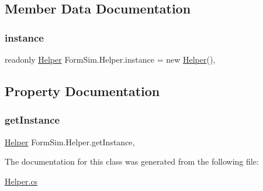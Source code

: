\subsection{Member Data Documentation}
\mbox{\label{class_form_sim_1_1_helper_a100712088360a52887cbecd891548038}} 
\subsubsection{\texorpdfstring{instance}{instance}}
{\footnotesize\ttfamily readonly \mbox{\hyperlink{class_form_sim_1_1_helper}{Helper}} Form\+Sim.\+Helper.\+instance = new \mbox{\hyperlink{class_form_sim_1_1_helper}{Helper}}()\hspace{0.3cm}{\ttfamily [static]}, {\ttfamily [private]}}



\subsection{Property Documentation}
\mbox{\label{class_form_sim_1_1_helper_ac61d1dca7ce9b1fa7e4ce17e99b0b7e1}} 
\subsubsection{\texorpdfstring{get\+Instance}{getInstance}}
{\footnotesize\ttfamily \mbox{\hyperlink{class_form_sim_1_1_helper}{Helper}} Form\+Sim.\+Helper.\+get\+Instance\hspace{0.3cm}{\ttfamily [static]}, {\ttfamily [get]}}



The documentation for this class was generated from the following file\+:\begin{DoxyCompactItemize}
\item 
\mbox{\hyperlink{_helper_8cs}{Helper.\+cs}}\end{DoxyCompactItemize}
